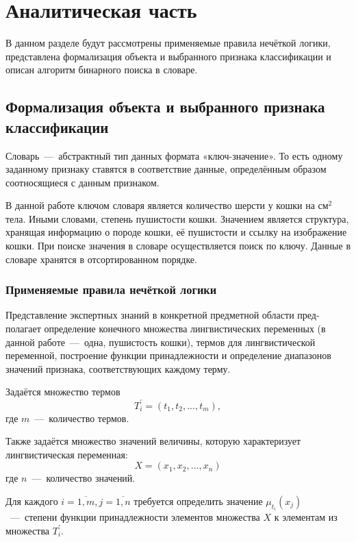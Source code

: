 \chapter{Аналитическая часть}
В данном разделе будут рассмотрены применяемые правила нечёткой логики, представлена формализация объекта и выбранного признака классификации и описан алгоритм бинарного поиска в словаре.

\section{Формализация объекта и выбранного признака классификации}
Словарь~---~абстрактный тип данных формата «ключ-значение». То есть одному заданному признаку ставятся в соответствие данные, определённым образом соотносящиеся с данным признаком. 

В данной работе ключом словаря является количество шерсти у кошки на см$^2$ тела. Иными словами, степень пушистости кошки. Значением является структура, хранящая информацию о породе кошки, её пушистости и ссылку на изображение кошки. При поиске значения в словаре осуществляется поиск по ключу. Данные в словаре хранятся в отсортированном порядке.

\subsection{Применяемые правила нечёткой логики}
Представление экспертных знаний в конкретной предметной области пред- полагает определение конечного множества лингвистических переменных (в данной работе~---~одна, пушистость кошки), термов для лингвистической переменной, построение функции принадлежности и определение диапазонов значений признака, соответствующих каждому терму.

Задаётся множество термов
\begin{equation}
	T^{'}_i = (t_1, t_2, ..., t_m),
\end{equation}
где $m$~---~количество термов.

Также задаётся множество значений величины, которую характеризует лингвистическая переменная:
\begin{equation}
	X = (x_1, x_2, ..., x_n)
\end{equation}
где $n$~---~количество значений.

Для каждого $i = \overline{1,m}, j = \overline{1,n}$ требуется определить значение $\mu_{t_i}(x_j)$~---~степени функции принадлежности элементов множества $X$ к элементам из множества $T_i^{'}$.

